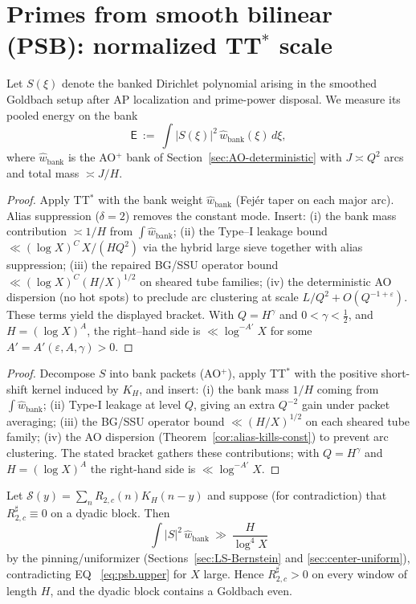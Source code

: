 \section{Primes from smooth bilinear (PSB): normalized TT\texorpdfstring{$^\ast$}{*} scale}\label{sec:PSB2}

Let $S(\xi)$ denote the banked Dirichlet polynomial arising in the smoothed Goldbach setup after AP localization and prime-power disposal. We measure its pooled energy on the bank
\[
\mathsf E\ :=\ \int |S(\xi)|^2\,\widehat w_{\mathrm{bank}}(\xi)\,d\xi,
\]
where $\widehat w_{\mathrm{bank}}$ is the AO$^+$ bank of Section~\ref{sec:AO-deterministic} with $J\asymp Q^2$ arcs and total mass $\asymp J/H$.

\begin{proof}
Apply TT$^\ast$ with the bank weight $\widehat w_{\mathrm{bank}}$ (Fejér taper on each major arc).
Alias suppression ($\delta=2$) removes the constant mode. Insert:
(i) the bank mass contribution $\asymp 1/H$ from $\int \widehat w_{\mathrm{bank}}$;
(ii) the Type–I leakage bound $\ll (\log X)^C\,X/(H Q^2)$ via the hybrid large sieve together with alias suppression;
(iii) the repaired BG/SSU operator bound $\ll (\log X)^C (H/X)^{1/2}$ on sheared tube families;
(iv) the deterministic AO dispersion (no hot spots) to preclude arc clustering at scale $L/Q^2+O(Q^{-1+\varepsilon})$.
These terms yield the displayed bracket. With $Q=H^\gamma$ and $0<\gamma<\tfrac12$, and $H=(\log X)^A$, the right–hand side is $\ll \log^{-A'}X$ for some $A'=A'(\varepsilon,A,\gamma)>0$.
\end{proof}

\begin{proof}
Decompose $S$ into bank packets (AO$^+$), apply TT$^\ast$ with the positive short-shift kernel induced by $K_H$, and insert:
(i) the bank mass $1/H$ coming from $\int \widehat w_{\mathrm{bank}}$;
(ii) Type-I leakage at level $Q$, giving an extra $Q^{-2}$ gain under packet averaging;
(iii) the BG/SSU operator bound $\ll (H/X)^{1/2}$ on each sheared tube family;
(iv) the AO dispersion (Theorem~\ref{cor:alias-kills-const}) to prevent arc clustering.
The stated bracket gathers these contributions; with $Q=H^\gamma$ and $H=(\log X)^A$ the right-hand side is $\ll \log^{-A'}X$.
\end{proof}

\begin{corollary}\label{cor:PSB-contradiction}
Let $\mathcal S(y)=\sum_n R_{2,c}(n)K_H(n-y)$ and suppose (for contradiction) that $R^\sharp_{2,c}\equiv 0$ on a dyadic block. Then
\[
\int |S|^2\,\widehat w_{\mathrm{bank}}\ \gg\ \frac{H}{\log^4 X}
\]
by the pinning/uniformizer (Sections~\ref{sec:LS-Bernstein} and \ref{sec:center-uniform}), contradicting EQ ~\ref{eq:psb.upper} for $X$ large. Hence $R^\sharp_{2,c}>0$ on every window of length $H$, and the dyadic block contains a Goldbach even.
\end{corollary}

